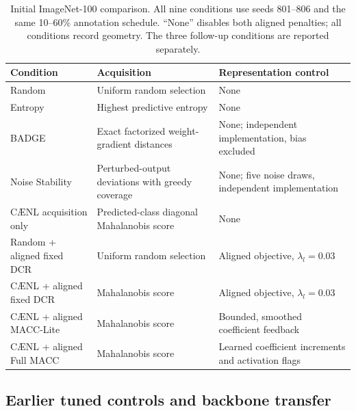 \documentclass[10pt,a4paper,twocolumn]{article}
\newcommand{\model}{C\AE{}NL}
\begin{document}
\begin{table}[tbp]
\caption{Initial ImageNet-100 comparison. All nine conditions use
seeds 801--806 and the same 10--60\% annotation schedule.
``None'' disables both aligned penalties; all conditions record geometry.
The three follow-up conditions are reported separately.}
\label{tab:baselines}
\centering\small
\begin{tabularx}{\textwidth}{@{}p{}p{}Y@{}}
\toprule
Condition & Acquisition & Representation control \\
\midrule
Random & Uniform random selection & None \\
Entropy & Highest predictive entropy & None \\
BADGE & Exact factorized weight-gradient distances &
None; independent implementation, bias excluded \\
Noise Stability & Perturbed-output deviations with greedy coverage &
None; five noise draws, independent implementation \\
\model{} acquisition only &
Predicted-class diagonal Mahalanobis score & None \\
Random + aligned fixed DCR & Uniform random selection &
Aligned objective, $\lambda_l=0.03$ \\
\model{} + aligned fixed DCR & Mahalanobis score &
Aligned objective, $\lambda_l=0.03$ \\
\model{} + aligned MACC-Lite & Mahalanobis score &
Bounded, smoothed coefficient feedback \\
\model{} + aligned Full MACC & Mahalanobis score &
Learned coefficient increments and activation flags \\
\bottomrule
\end{tabularx}
\end{table}

\subsection{Earlier tuned controls and backbone transfer}
\label{sec:feedback_design}
\end{document}
